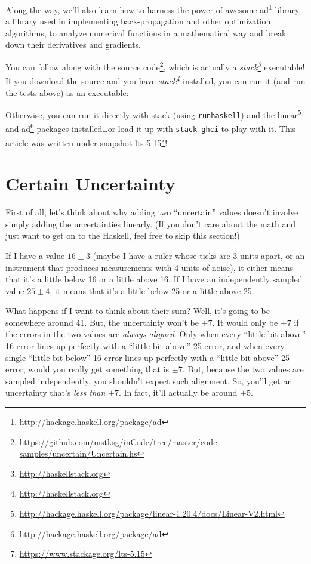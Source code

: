 \documentclass[]{article}
\newenvironment{Shaded}{}{}
\newcommand{\KeywordTok}[1]{\textcolor[rgb]{0.00,0.44,0.13}{\textbf{{#1}}}}
\newcommand{\NormalTok}[1]{{#1}}
\renewcommand{\href}[2]{#2\footnote{\url{#1}}}
\begin{document}
Along the way, we'll also learn how to harness the power of awesome
\href{http://hackage.haskell.org/package/ad}{ad} library, a library used
in implementing back-propagation and other optimization algorithms, to
analyze numerical functions in a mathematical way and break down their
derivatives and gradients.

You can follow along with
\href{https://github.com/mstksg/inCode/tree/master/code-samples/uncertain/Uncertain.hs}{the
source code}, which is actually a
\emph{\href{http://haskellstack.org}{stack}} executable! If you download
the source and you have \emph{\href{http://haskellstack.org}{stack}}
installed, you can run it (and run the tests above) as an executable:

\begin{Shaded}
\end{Shaded}

Otherwise, you can run it directly with stack (using
\texttt{runhaskell}) and the
\href{http://hackage.haskell.org/package/linear-1.20.4/docs/Linear-V2.html}{linear}
and \href{http://hackage.haskell.org/package/ad}{ad} packages
installed\ldots{}or load it up with \texttt{stack\ ghci} to play with
it. This article was written under snapshot
\href{https://www.stackage.org/lts-5.15}{lts-5.15}!

\section{Certain Uncertainty}\label{certain-uncertainty}

First of all, let's think about why adding two ``uncertain'' values
doesn't involve simply adding the uncertainties linearly. (If you don't
care about the math and just want to get on to the Haskell, feel free to
skip this section!)

If I have a value \(16 \pm 3\) (maybe I have a ruler whose ticks are 3
units apart, or an instrument that produces measurements with 4 units of
noise), it either means that it's a little below 16 or a little above
16. If I have an independently sampled value \(25 \pm 4\), it means that
it's a little below 25 or a little above 25.

What happens if I want to think about their sum? Well, it's going to be
somewhere around 41. But, the uncertainty won't be \(\pm 7\). It would
only be \(\pm 7\) if the errors in the two values are \emph{always
aligned}. Only when every ``little bit above'' 16 error lines up
perfectly with a ``little bit above'' 25 error, and when every single
``little bit below'' 16 error lines up perfectly with a ``little bit
above'' 25 error, would you really get something that is \(\pm 7\). But,
because the two values are sampled independently, you shouldn't expect
such alignment. So, you'll get an uncertainty that's \emph{less than}
\(\pm 7\). In fact, it'll actually be around \(\pm 5\).
\end{document}
